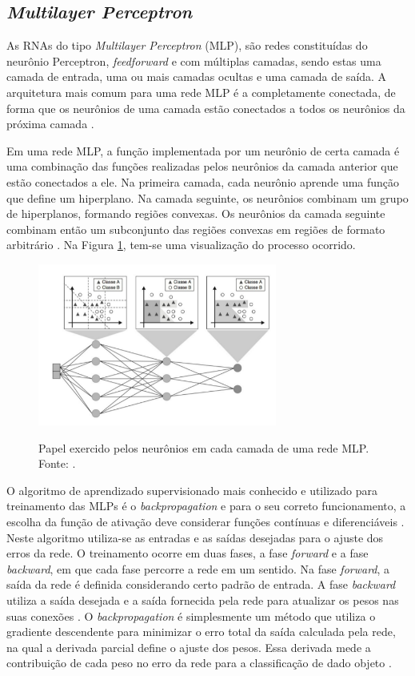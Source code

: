 \subsection{\emph{Multilayer Perceptron}}
\label{subsubsec:mlp}

As RNAs do tipo \emph{Multilayer Perceptron} (MLP), são redes constituídas do neurônio Perceptron, \emph{feedforward} e com múltiplas camadas, sendo estas uma camada de entrada, uma ou mais camadas ocultas e uma camada de saída. A arquitetura mais comum para uma rede MLP é a completamente conectada, de forma que os neurônios de uma camada estão conectados a todos os neurônios da próxima camada \cite{faceli}.

Em uma rede MLP, a função implementada por um neurônio de certa camada é uma combinação das funções realizadas pelos neurônios da camada anterior que estão conectados a ele. Na primeira camada, cada neurônio aprende uma função que define um hiperplano. Na camada seguinte, os neurônios combinam um grupo de hiperplanos, formando regiões convexas. Os neurônios da camada seguinte combinam então um subconjunto das regiões convexas em regiões de formato arbitrário \cite{faceli}. Na Figura \ref{fig:aprendizado-mlp}, tem-se uma visualização do processo ocorrido.


\begin{figure}[h!]
\centering
\caption{Papel exercido pelos neurônios em cada camada de uma rede MLP. Fonte: \cite{faceli}.}
\includegraphics[width=0.7\textwidth]{imgs/aprendizado-mlp}
\label{fig:aprendizado-mlp}
\end{figure}

O algoritmo de aprendizado supervisionado mais conhecido e utilizado para treinamento das MLPs é o \emph{backpropagation} e para o seu correto funcionamento, a escolha da função de ativação deve considerar funções contínuas e diferenciáveis  \cite{haykin}. Neste algoritmo utiliza-se as entradas e as saídas desejadas para o ajuste dos erros da rede. O treinamento ocorre em duas fases, a fase \emph{forward} e a fase \emph{backward}, em que cada fase percorre a rede em um sentido. Na fase \emph{forward}, a saída da rede é definida considerando certo padrão de entrada. A fase \emph{backward} utiliza a saída desejada e a saída fornecida pela rede para atualizar os pesos nas suas conexões \cite{braga}. O \emph{backpropagation} é simplesmente um método que utiliza o gradiente descendente para minimizar o erro total da saída calculada pela rede, na qual a derivada parcial define o ajuste dos pesos. Essa derivada mede a contribuição de cada peso no erro da rede para a classificação de dado objeto \cite{fausett, faceli}.


